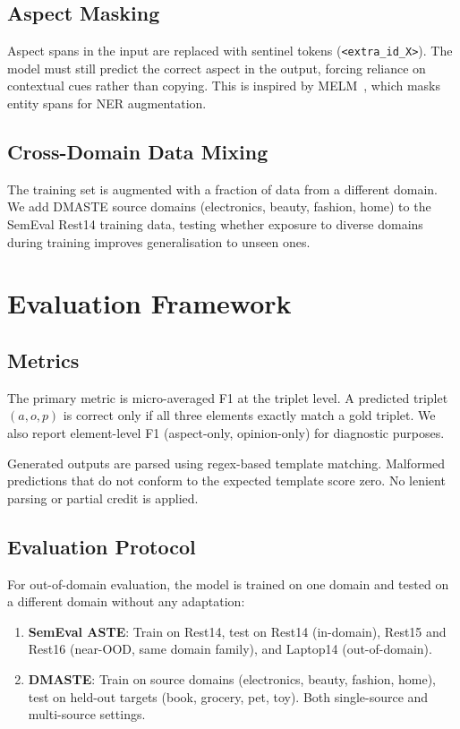 \documentclass[12pt,a4paper]{report}
\begin{document}
\subsection{Aspect Masking}

Aspect spans in the input are replaced with sentinel tokens (\texttt{<extra\_id\_X>}). The model must still predict the correct aspect in the output, forcing reliance on contextual cues rather than copying. This is inspired by MELM~\cite{zhou2022melm}, which masks entity spans for NER augmentation.

\subsection{Cross-Domain Data Mixing}

The training set is augmented with a fraction of data from a different domain. We add DMASTE source domains (electronics, beauty, fashion, home) to the SemEval Rest14 training data, testing whether exposure to diverse domains during training improves generalisation to unseen ones.


\section{Evaluation Framework}\label{sec:evaluation}

\subsection{Metrics}

The primary metric is micro-averaged F1 at the triplet level. A predicted triplet $(a, o, p)$ is correct only if all three elements exactly match a gold triplet. We also report element-level F1 (aspect-only, opinion-only) for diagnostic purposes.

Generated outputs are parsed using regex-based template matching. Malformed predictions that do not conform to the expected template score zero. No lenient parsing or partial credit is applied.

\subsection{Evaluation Protocol}

For out-of-domain evaluation, the model is trained on one domain and tested on a different domain without any adaptation:

\begin{enumerate}
    \item \textbf{SemEval ASTE}: Train on Rest14, test on Rest14 (in-domain), Rest15 and Rest16 (near-OOD, same domain family), and Laptop14 (out-of-domain).
    \item \textbf{DMASTE}: Train on source domains (electronics, beauty, fashion, home), test on held-out targets (book, grocery, pet, toy). Both single-source and multi-source settings.
\end{enumerate}
\end{document}
